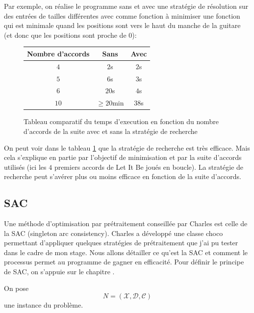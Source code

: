 Par exemple, on réalise le programme sans et avec une stratégie de résolution
sur des entrées de tailles différentes avec comme fonction à minimiser une
fonction qui est minimale quand les positions sont vers le haut du manche de la
guitare (et donc que les positions sont proche de $0$):

\begin{figure}[H]
  \centering
  \begin{tabular}{||c c c||}
    \hline
    Nombre d'accords & Sans & Avec \\ [0.5ex]
    \hline\hline
    $4$ & $2$s & $2$s \\
    \hline
    $5$ & $6$s & $3$s \\
    \hline
    $6$ & $20$s & $4$s \\
    \hline
    $10$ & $\geqslant20$min & $38$s\\[1ex]
    \hline
  \end{tabular}
\caption{Tableau comparatif du temps d'execution en fonction du nombre\\
  d'accords de la suite avec et sans la stratégie de recherche}
\label{tab:compSR}
\end{figure}

On peut voir dans le tableau \ref{tab:compSR} que la stratégie de recherche est
très efficace. Mais cela s'explique en partie par l'objectif de minimisation et
par la suite d'accords utilisés (ici les $4$ premiers accords de Let It Be
joués en boucle). La stratégie de recherche peut s'avérer plus ou moins
efficace en fonction de la suite d'accords.

\subsection{SAC}
\label{subsec:SAC}

Une méthode d'optimisation par prétraitement conseillée par Charles est celle 
de la SAC (singleton arc consistency). 
Charles a développé une classe choco permettant d'appliquer quelques stratégies 
de prétraitement que j'ai pu tester dans le cadre de mon stage.
Nous allons détailler ce qu'est la SAC et comment le processus permet au
programme de gagner en efficacité. Pour définir le principe de SAC, on s'appuie 
sur le chapitre \cite{BESSIEREsac}.

On pose $$N = \left(\mathcal{X}, \mathcal{D}, \mathcal{C}\right)$$ une instance
du problème.

